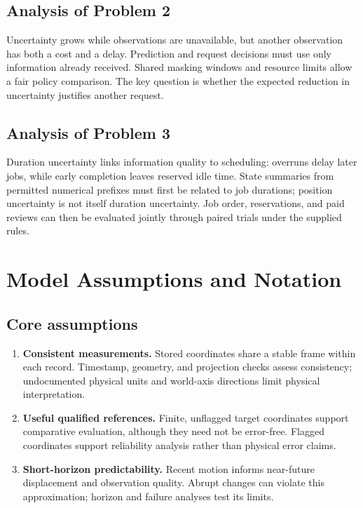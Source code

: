 \subsection{Analysis of Problem 2}
Uncertainty grows while observations are unavailable, but another observation has both a cost and a delay. Prediction and request decisions must use only information already received. Shared masking windows and resource limits allow a fair policy comparison. The key question is whether the expected reduction in uncertainty justifies another request.

\subsection{Analysis of Problem 3}
Duration uncertainty links information quality to scheduling: overruns delay later jobs, while early completion leaves reserved idle time. State summaries from permitted numerical prefixes must first be related to job durations; position uncertainty is not itself duration uncertainty. Job order, reservations, and paid reviews can then be evaluated jointly through paired trials under the supplied rules.

\section{Model Assumptions and Notation}
\subsection{Core assumptions}
\begin{enumerate}
\item \textbf{Consistent measurements.} Stored coordinates share a stable frame within each record. Timestamp, geometry, and projection checks assess consistency; undocumented physical units and world-axis directions limit physical interpretation.
\item \textbf{Useful qualified references.} Finite, unflagged target coordinates support comparative evaluation, although they need not be error-free. Flagged coordinates support reliability analysis rather than physical error claims.
\item \textbf{Short-horizon predictability.} Recent motion informs near-future displacement and observation quality. Abrupt changes can violate this approximation; horizon and failure analyses test its limits.
\end{enumerate}

